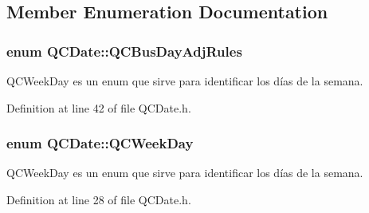 \subsection{Member Enumeration Documentation}
\hypertarget{class_q_c_date_a17e5b6c9a1a784f917c8e84045d7e362}{
\subsubsection[{Q\+C\+Bus\+Day\+Adj\+Rules}]{\setlength{\rightskip}{0pt plus 5cm}enum {\bf Q\+C\+Date\+::\+Q\+C\+Bus\+Day\+Adj\+Rules}}}\label{class_q_c_date_a17e5b6c9a1a784f917c8e84045d7e362}
Q\+C\+Week\+Day es un enum que sirve para identificar los días de la semana. 

Definition at line 42 of file Q\+C\+Date.\+h.

\hypertarget{class_q_c_date_a19bc952d3dba68ce61881ec85837c7eb}{
\subsubsection[{Q\+C\+Week\+Day}]{\setlength{\rightskip}{0pt plus 5cm}enum {\bf Q\+C\+Date\+::\+Q\+C\+Week\+Day}}}\label{class_q_c_date_a19bc952d3dba68ce61881ec85837c7eb}
Q\+C\+Week\+Day es un enum que sirve para identificar los días de la semana. 

Definition at line 28 of file Q\+C\+Date.\+h.



